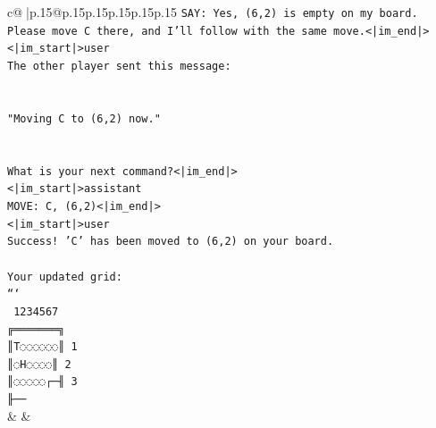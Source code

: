\documentclass{article}
\begin{document}
{\begin{supertabular}{c@{$\;$}|p{.15\linewidth}@{}p{.15\linewidth}p{.15\linewidth}p{.15\linewidth}p{.15\linewidth}p{.15\linewidth}}
{{{\texttt{SAY: Yes, (6,2) is empty on my board. Please move C there, and I'll follow with the same move.<|im\_end|>} \\
\texttt{<|im\_start|>user} \\
\texttt{The other player sent this message:} \\
\\ 
\\ 
\texttt{"Moving C to (6,2) now."} \\
\\ 
\\ 
\texttt{What is your next command?<|im\_end|>} \\
\texttt{<|im\_start|>assistant} \\
\texttt{MOVE: C, (6,2)<|im\_end|>} \\
\texttt{<|im\_start|>user} \\
\texttt{Success! 'C' has been moved to (6,2) on your board.} \\
\\ 
\texttt{Your updated grid:} \\
\texttt{```} \\
\texttt{ 1234567} \\
\texttt{╔═══════╗} \\
\texttt{║T◌◌◌◌◌◌║ 1} \\
\texttt{║◌H◌◌◌◌║ 2} \\
\texttt{║◌◌◌◌◌┌─╢ 3} \\
\texttt{╟──} \\
            }
        }
    }
    & & \\ \\


\end{supertabular}}
\end{document}
